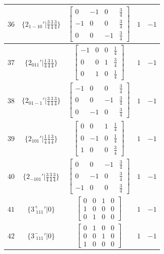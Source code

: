 \documentclass[fleqn,8pt]{jsarticle}
\begin{document}
\begin{longtable}{ccccc}
$ 36 $ & $ \{2{}_{1-10}{}'|\frac{3}{4} \frac{3}{4} \frac{3}{4}\} $ & $ \begin{bmatrix} 0 & -1 & 0 & \frac{3}{4} \\ -1 & 0 & 0 & \frac{3}{4} \\ 0 & 0 & -1 & \frac{3}{4} \end{bmatrix} $ & $ 1 $ & $ -1 $ \\ \hline
$ 37 $ & $ \{2{}_{011}{}'|\frac{1}{4} \frac{3}{4} \frac{1}{4}\} $ & $ \begin{bmatrix} -1 & 0 & 0 & \frac{1}{4} \\ 0 & 0 & 1 & \frac{3}{4} \\ 0 & 1 & 0 & \frac{1}{4} \end{bmatrix} $ & $ 1 $ & $ -1 $ \\ \hline
$ 38 $ & $ \{2{}_{01-1}{}'|\frac{3}{4} \frac{3}{4} \frac{3}{4}\} $ & $ \begin{bmatrix} -1 & 0 & 0 & \frac{3}{4} \\ 0 & 0 & -1 & \frac{3}{4} \\ 0 & -1 & 0 & \frac{3}{4} \end{bmatrix} $ & $ 1 $ & $ -1 $ \\ \hline
$ 39 $ & $ \{2{}_{101}{}'|\frac{1}{4} \frac{1}{4} \frac{3}{4}\} $ & $ \begin{bmatrix} 0 & 0 & 1 & \frac{1}{4} \\ 0 & -1 & 0 & \frac{1}{4} \\ 1 & 0 & 0 & \frac{3}{4} \end{bmatrix} $ & $ 1 $ & $ -1 $ \\ \hline
$ 40 $ & $ \{2{}_{-101}{}'|\frac{3}{4} \frac{3}{4} \frac{3}{4}\} $ & $ \begin{bmatrix} 0 & 0 & -1 & \frac{3}{4} \\ 0 & -1 & 0 & \frac{3}{4} \\ -1 & 0 & 0 & \frac{3}{4} \end{bmatrix} $ & $ 1 $ & $ -1 $ \\ \hline
$ 41 $ & $ \{3^{+}_{\,\,111}{}'|0\} $ & $ \begin{bmatrix} 0 & 0 & 1 & 0 \\ 1 & 0 & 0 & 0 \\ 0 & 1 & 0 & 0 \end{bmatrix} $ & $ 1 $ & $ -1 $ \\ \hline
$ 42 $ & $ \{3^{-}_{\,\,111}{}'|0\} $ & $ \begin{bmatrix} 0 & 1 & 0 & 0 \\ 0 & 0 & 1 & 0 \\ 1 & 0 & 0 & 0 \end{bmatrix} $ & $ 1 $ & $ -1 $ \\ \hline

\end{longtable}
\end{document}
